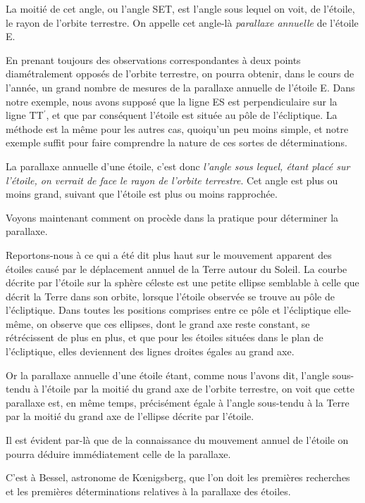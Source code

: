 \documentclass[a4paper, 11pt, oneside, landscape]{article}
\begin{document}
La moitié de cet angle, ou l'angle SET, est l'angle sous lequel on voit, de l'étoile, le rayon de l'orbite terrestre. On appelle cet angle-là \emph{parallaxe annuelle} de l'étoile E.

En prenant toujours des observations correspondantes à deux points diamétralement opposés de l'orbite terrestre, on pourra obtenir, dans le cours de l'année, un grand nombre de mesures de la parallaxe annuelle de l'étoile E. Dans notre exemple, nous avons supposé que la ligne ES est perpendiculaire sur la ligne TT$^{\prime}$, et que par conséquent l'étoile est située au pôle de l'écliptique. La méthode est la même pour les autres cas, quoiqu'un peu moins simple, et notre exemple suffit pour faire comprendre la nature de ces sortes de déterminations.

La parallaxe annuelle d'une étoile, c'est donc \emph{l'angle sous lequel, étant placé sur l'étoile, on verrait de face le rayon de l'orbite terrestre}. Cet angle est plus ou moins grand, suivant que l'étoile est plus ou moins rapprochée.

Voyons maintenant comment on procède dans la pratique pour déterminer la parallaxe.

Reportons-nous à ce qui a été dit plus haut sur le mouvement apparent des étoiles causé par le déplacement annuel de la Terre autour du Soleil. La courbe décrite par l'étoile sur la sphère céleste est une petite ellipse semblable à celle que décrit la Terre dans son orbite, lorsque l'étoile observée se trouve au pôle de l'écliptique. Dans toutes les positions comprises entre ce pôle et l'écliptique elle-même, on observe que ces ellipses, dont le grand axe reste constant, se rétrécissent de plus en plus, et que pour les étoiles situées dans le plan de l'écliptique, elles deviennent des lignes droites égales au grand axe.

Or la parallaxe annuelle d'une étoile étant, comme nous l'avons dit, l'angle sous-tendu à l'étoile par la moitié du grand axe de l'orbite terrestre, on voit que cette parallaxe est, en même temps, précisément égale à l'angle sous-tendu à la Terre par la moitié du grand axe de l'ellipse décrite par l'étoile.

Il est évident par-là que de la connaissance du mouvement annuel de l'étoile on pourra déduire immédiatement celle de la parallaxe.

C'est à Bessel, astronome de Kœnigsberg, que l'on doit les premières recherches et les premières déterminations relatives à la parallaxe des étoiles.
\end{document}
